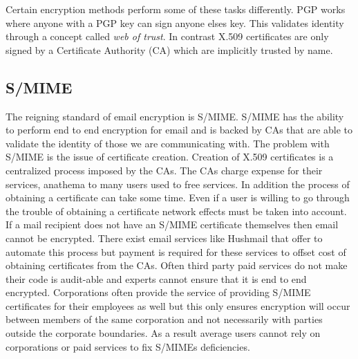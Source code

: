 \documentclass[10pt]{article}
\begin{document}
\begin{multicols}{2}
Certain encryption methods perform some of these tasks differently. PGP works where anyone with a PGP key can sign anyone elses key. This validates identity through a concept called \textit{web of trust}. In contrast X.509 certificates are only signed by a Certificate Authority (CA) which are implicitly trusted by name.

\subsection{S/MIME}
\par The reigning standard of email encryption is S/MIME. S/MIME has the ability to perform end to end encryption for email and is backed by CAs that are able to validate the identity of those we are communicating with. The problem with S/MIME is the issue of certificate creation. Creation of X.509 certificates is a centralized process imposed by the CAs\cite{garfinkel2005johnny}. The CAs charge expense for their services, anathema to many users used to free services. In addition the process of obtaining a certificate can take some time. Even if a user is willing to go through the trouble of obtaining a certificate network effects must be taken into account. If a mail recipient does not have an S/MIME certificate themselves then email cannot be encrypted. There exist email services like Hushmail that offer to automate this process but payment is required for these services to offset cost of obtaining certificates from the CAs. Often third party paid services do not make their code is audit-able and experts cannot ensure that it is end to end encrypted. Corporations often provide the service of providing S/MIME certificates for their employees as well but this only ensures encryption will occur between members of the same corporation and not necessarily with parties outside the corporate boundaries. As a result average users cannot rely on corporations or paid services to fix S/MIMEs deficiencies.

\end{multicols}
\end{document}
